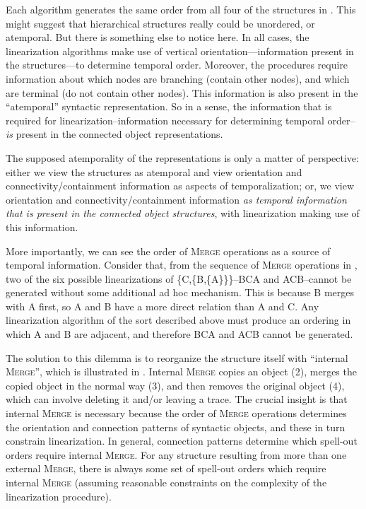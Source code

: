   Each algorithm generates the same order from all four of the structures in {}. This might suggest that hierarchical structures really could be unordered, or atemporal. But there is something else to notice here. In all cases, the linearization algorithms make use of vertical orientation—information present in the structures—to determine temporal order. Moreover, the procedures require information about which nodes are branching (contain other nodes), and which are terminal (do not contain other nodes). This information is also present in the “atemporal” syntactic representation. So in a sense, the information that is required for linearization--information necessary for determining temporal order--\textit{is} present in the connected object representations. 

  The supposed atemporality of the representations is only a matter of perspective: either we view the structures as atemporal and view orientation and connectivity/containment information as aspects of temporalization; or, we view orientation and connectivity/containment information \textit{as temporal information that is present in the connected object structures}, with linearization making use of this information. 

  More importantly, we can see the order of \textsc{Merge} operations as a source of temporal information. Consider that, from the sequence of \textsc{Merge} operations in {}, two of the six possible linearizations of \{C,\{B,\{A\}\}\}--BCA and ACB--cannot be generated without some additional ad hoc mechanism. This is because B merges with A first, so A and B have a more direct relation than A and C. Any linearization algorithm of the sort described above must produce an ordering in which A and B are adjacent, and therefore BCA and ACB cannot be generated.

  The solution to this dilemma is to reorganize the structure itself with “internal \textsc{Merge}”, which is illustrated in {}. Internal \textsc{Merge} copies an object (2), merges the copied object in the normal way (3), and then removes the original object (4), which can involve deleting it and/or leaving a trace. The crucial insight is that internal \textsc{Merge} is necessary because the order of \textsc{Merge} operations determines the orientation and connection patterns of syntactic objects, and these in turn constrain linearization. In general, connection patterns determine which spell-out orders require internal \textsc{Merge}. For any structure resulting from more than one external \textsc{Merge}, there is always some set of spell-out orders which require internal \textsc{Merge} (assuming reasonable constraints on the complexity of the linearization procedure).

